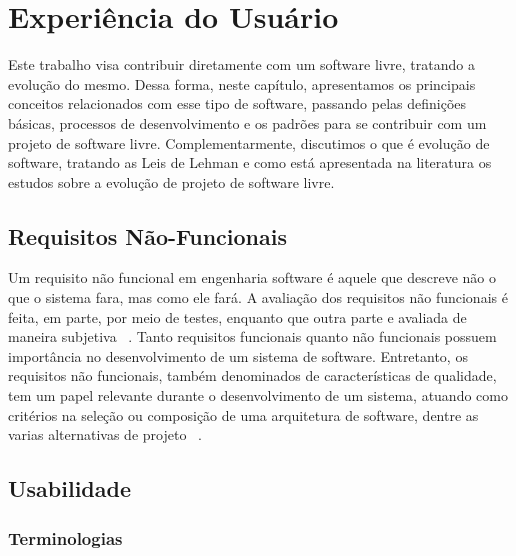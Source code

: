\chapter{Experiência do Usuário}
\label{cap-exp-user}

Este trabalho visa contribuir diretamente com um software livre, tratando a evolução do mesmo. Dessa forma, neste capítulo, apresentamos os principais conceitos relacionados com esse tipo de software, passando pelas definições básicas, processos de desenvolvimento e os padrões para se contribuir com um projeto de software livre. Complementarmente, discutimos o que é evolução de software, tratando as Leis de Lehman e como está apresentada na literatura os estudos sobre a evolução de projeto de software livre.




\section{Requisitos Não-Funcionais}

Um requisito não funcional em engenharia software é aquele que descreve não o que o sistema fara, mas como ele fará. A avaliação dos requisitos não funcionais é feita, em parte, por meio de testes, enquanto que outra parte e avaliada de maneira subjetiva ~\cite{filho2010}. Tanto requisitos funcionais quanto não funcionais possuem importância no desenvolvimento de um sistema de software. Entretanto, os requisitos não funcionais, também denominados de características de qualidade, tem um papel relevante durante o desenvolvimento de um sistema, atuando como critérios na seleção ou composição de uma arquitetura de software, dentre as varias alternativas de projeto ~\cite{filho2010}.

\section{Usabilidade}

\subsection{Terminologias}
\label{sec-terminologias}


